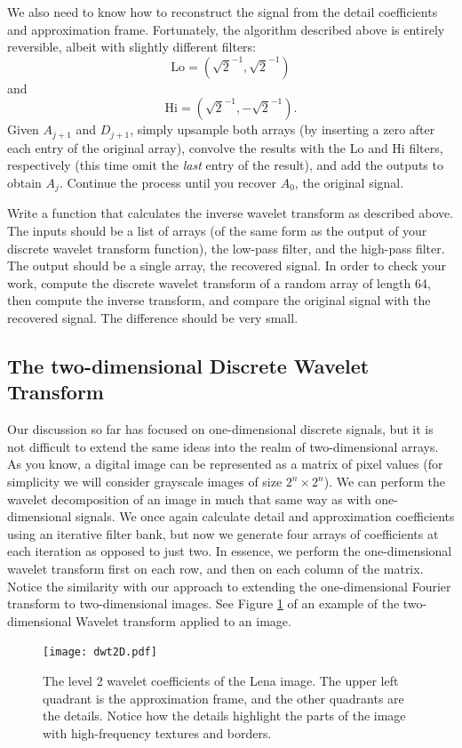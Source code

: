 We also need to know how to reconstruct the signal from the detail coefficients and
approximation frame. Fortunately, the algorithm described above is entirely reversible,
albeit with slightly different filters:
$$\text{Lo} = (\sqrt{2}^{-1}, \sqrt{2}^{-1})$$ and
$$\text{Hi} = (\sqrt{2}^{-1}, -\sqrt{2}^{-1}).$$
Given $A_{j+1}$ and $D_{j+1}$, simply upsample both arrays (by inserting a zero after
each entry of the original array), convolve the results
with the Lo and Hi filters, respectively (this time omit the \emph{last} entry of the
result), and add the outputs to obtain $A_j$. Continue the
process until you recover $A_0$, the original signal.
\begin{problem}
Write a function that calculates the inverse wavelet transform as described above.
The inputs should be a list of arrays (of the same form as the output of your discrete
wavelet transform function), the low-pass filter, and the high-pass filter. The output
should be a single array, the recovered signal. In order to check your work, compute
the discrete wavelet transform of a random array of length 64, then compute the inverse
transform, and compare the original signal with the recovered signal. The difference
should be very small.
\end{problem}

\subsection*{The two-dimensional Discrete Wavelet Transform}
Our discussion so far has focused on one-dimensional
discrete signals, but it is not difficult to extend the same ideas into the
realm of two-dimensional arrays. As you know, a digital image can be represented
as a matrix of pixel values (for simplicity we will consider grayscale images of
size $2^n \times 2^n$). We can perform the wavelet decomposition of
an image in much that same way as with one-dimensional signals. We once again
calculate detail and approximation coefficients using an iterative filter
bank, but now we generate four arrays of coefficients at each iteration as opposed to
just two. In essence, we perform the one-dimensional wavelet transform first on each
row, and then on each column of the matrix. Notice the similarity with our approach
to extending the one-dimensional Fourier transform to two-dimensional images. See
Figure \ref{fig:dwt2D} of an example of the two-dimensional Wavelet transform applied
to an image.

\begin{figure}
    \texttt{[image: dwt2D.pdf]}
    \caption{The level 2 wavelet coefficients of the Lena image. The upper left quadrant 
    is the approximation frame, and the other quadrants are the details. Notice how the 
    details highlight the parts of the image with high-frequency textures and borders.}
    \label{fig:dwt2D}
\end{figure}


